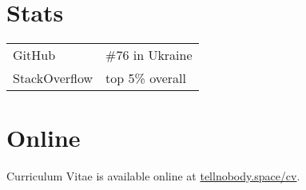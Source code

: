 \section{Stats}
\begin{tabular}{l|l}
GitHub & \#76 in Ukraine \\
StackOverflow & top 5\% overall
\end{tabular}

\section{Online}
Curriculum Vitae is available online at \href{https://tellnobody.space/cv/}{tellnobody.space/cv}.

